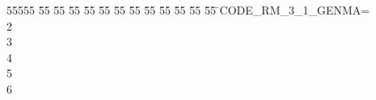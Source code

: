 %
%
\begin{tabbing}
55555 \= 55 \= 55 \= 55 \= 55 \= 55 \= 55 \= 55 \= 55 \= 55 \= 55 \= 55 \= 55 \= \>CODE\_RM\_3\_1\_GENMA=\\[0pt]
2\\[0pt]
3\\[0pt]
4\\[0pt]
5\\[0pt]
6\>\end{tabbing}
